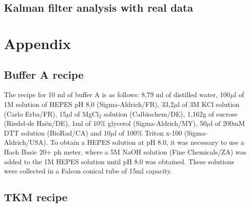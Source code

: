 \documentclass[12pt, a4paper]{article} %
\begin{document}
\setlength{\parskip}{4mm}

\subsection{Kalman filter analysis with real data}

\setlength{\parskip}{0mm}

\setlength{\parskip}{4mm}

\newpage

\newpage

\pagestyle{empty}



\newpage
\setlength{\parskip}{0mm}
\section{Appendix}

\subsection{Buffer A recipe}

The recipe for 10 ml of buffer A is as follows: 8,79 ml of distilled water, 100$\mu$l of 1M solution of HEPES pH 8,0 (Sigma-Aldrich/FR), 33,2$\mu$l of 3M KCl solution (Carlo Erba/FR), 15$\mu$l of MgCl$_{2}$ solution (Calbiochem/DE), 1,162g of sucrose (Riedel-de Haën/DE), 1ml of 10\% glycerol (Sigma-Aldrich/MY), 50$\mu$l of 200mM DTT solution (BioRad/CA) and 10$\mu$l of 100\% Triton x-100 (Sigma-Aldrich/USA). To obtain a HEPES solution at pH 8.0, it was necessary to use a Hach Basic 20+ ph meter, where a 5M NaOH solution (Fine Chemicals/ZA) was added to the 1M HEPES solution until pH 8.0 was obtained. These solutions were collected in a Falcon conical tube of 15ml capacity. 

\subsection{TKM recipe}
\end{document}

